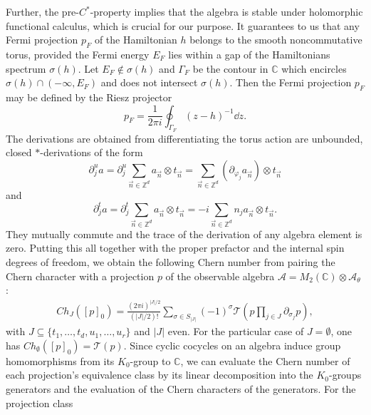 \documentclass[submission, Phys]{SciPost}
\begin{document}
Further, the pre-$C^\ast$-property implies that the algebra is stable under holomorphic functional calculus, which is crucial for our purpose. 
It guarantees to us that any Fermi projection $p_F$ of the Hamiltonian $h$ belongs to the smooth noncommutative torus, provided the Fermi energy $E_F$ lies within a gap of the Hamiltonians spectrum $\sigma(h)$. 
Let $E_F\notin \sigma(h)$ and $\Gamma_F$ be the contour in $\mathbb{C}$ which encircles $\sigma(h)\cap (-\infty,E_F)$ and does not intersect $\sigma(h)$. 
Then the Fermi projection $p_F$ may be defined by the Riesz projector
\begin{equation}
    p_F = \frac{1}{2\pi i} \oint_{\Gamma_F} (z-h)^{-1} \dd{z}.
    \label{eq:Riesz_projector}
\end{equation}
The derivations are obtained from differentiating the torus action are unbounded, closed $\ast$-derivations of the form %
\begin{equation}
    \partial_j^u a =\partial_j^u \sum_{\vec{n}\in \mathbb{Z}^d} a_{\vec{n}} \otimes t_{\vec{n}} = \sum_{\vec{n}\in \mathbb{Z}^d}  (\partial_{\varphi_j} a_{\vec{n}}) \otimes t_{\vec{n}}
\end{equation}
and
\begin{equation}
    \partial_j^t a =\partial_j^t \sum_{\vec{n}\in \mathbb{Z}^d} a_{\vec{n}} \otimes t_{\vec{n}} = -i \sum_{\vec{n}\in \mathbb{Z}^d} n_j a_{\vec{n}} \otimes t_{\vec{n}}.
\end{equation}
They mutually commute and the trace of the derivation of any algebra element is zero.
Putting this all together with the proper prefactor and the internal spin degrees of freedom, we obtain the following Chern number from pairing the Chern character with a projection $p$ of the observable algebra $\mathcal{A}=M_2(\mathbb{C})\otimes \mathcal{A}_\theta$ \cite{Prodan2013b}:
\begin{align}
    Ch_J([p]_0) = \frac{(2\pi i )^{ | J| /2 }}{(| J| /2)!}  \sum_{\sigma \in S_{|J|} } (-1)^\sigma \mathcal{T}\left( p \prod_{j \in J} \partial_{\sigma_j} p \right),
    \label{eq:Chernnumber}
\end{align}
with $J\subseteq \{t_1, \ldots, t_d, u_1, \ldots, u_r\}$ and $|J|$ even. For the particular case of $J=\emptyset$, one has $ Ch_\emptyset([p]_0) = \mathcal{T}(p)$.
Since cyclic cocycles on an algebra induce group homomorphisms from its $K_0$-group to $\mathbb{C}$, we can evaluate the Chern number of each projection's equivalence class by its linear decomposition into the $K_0$-groups generators and the evaluation of the Chern characters of the generators. For the projection class
\end{document}
